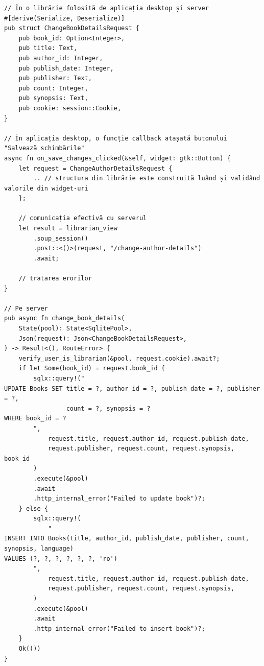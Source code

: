 \documentclass{article}
\begin{document}
    \begin{verbatim}
// În o librărie folosită de aplicația desktop și server
#[derive(Serialize, Deserialize)]
pub struct ChangeBookDetailsRequest {
    pub book_id: Option<Integer>,
    pub title: Text,
    pub author_id: Integer,
    pub publish_date: Integer,
    pub publisher: Text,
    pub count: Integer,
    pub synopsis: Text,
    pub cookie: session::Cookie,
}

// În aplicația desktop, o funcție callback atașată butonului "Salvează schimbările"
async fn on_save_changes_clicked(&self, widget: gtk::Button) {
    let request = ChangeAuthorDetailsRequest {
        .. // structura din librărie este construită luând și validând valorile din widget-uri
    };

    // comunicația efectivă cu serverul
    let result = librarian_view
        .soup_session()
        .post::<()>(request, "/change-author-details")
        .await;

    // tratarea erorilor
}

// Pe server
pub async fn change_book_details(
    State(pool): State<SqlitePool>,
    Json(request): Json<ChangeBookDetailsRequest>,
) -> Result<(), RouteError> {
    verify_user_is_librarian(&pool, request.cookie).await?;
    if let Some(book_id) = request.book_id {
        sqlx::query!("
UPDATE Books SET title = ?, author_id = ?, publish_date = ?, publisher = ?,
                 count = ?, synopsis = ?
WHERE book_id = ?
        ",
            request.title, request.author_id, request.publish_date,
            request.publisher, request.count, request.synopsis, book_id
        )
        .execute(&pool)
        .await
        .http_internal_error("Failed to update book")?;
    } else {
        sqlx::query!(
            "
INSERT INTO Books(title, author_id, publish_date, publisher, count, synopsis, language)
VALUES (?, ?, ?, ?, ?, ?, 'ro')
        ",
            request.title, request.author_id, request.publish_date,
            request.publisher, request.count, request.synopsis,
        )
        .execute(&pool)
        .await
        .http_internal_error("Failed to insert book")?;
    }
    Ok(())
}
    \end{verbatim}
\end{document}
